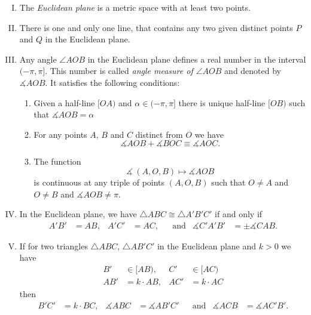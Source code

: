 \begin{enumerate}[I.]
\item\label{def:birkhoff-axioms:0} The \emph{Euclidean plane} is a metric space with at least two points.


\item\label{def:birkhoff-axioms:1} There is one and only one line, 
that contains any two given distinct points $P$ and $Q$ in the Euclidean plane.

\item\label{def:birkhoff-axioms:2} 
Any angle $\angle AOB$ in the Euclidean plane 
defines a real number in the interval $(-\pi,\pi]$.
This number is called \emph{angle measure of $\angle AOB$}
and denoted by $\measuredangle A O B$.
It satisfies the following conditions:
\begin{enumerate}
\item\label{def:birkhoff-axioms:2a} Given a half-line $[O A)$ and $\alpha\in(-\pi,\pi]$ there is unique  half-line $[O B)$ such that $\measuredangle A O B= \alpha$
\item\label{def:birkhoff-axioms:2b} For any points $A$, $B$ and $C$ distinct from $O$ we have
$$\measuredangle A O B+\measuredangle B O C\equiv \measuredangle A O C.$$
\item\label{def:birkhoff-axioms:2c} 
The function 
$$\measuredangle\:(A,O,B)\mapsto\measuredangle A O B$$
is continuous at any triple of points $(A,O,B)$
such that $O\ne A$ and $O\ne B$ and $\measuredangle A O B\ne\pi$.

\end{enumerate}

\item\label{def:birkhoff-axioms:3}  In the Euclidean plane, we have
$\triangle A B C\cong\triangle A' B' C'$
if and only if 
\begin{align*}
A' B'&=A B, & A' C'&= A C, &&\text{and}
&\measuredangle C' A' B'&=\pm\measuredangle C A B.
\end{align*}
\item\label{def:birkhoff-axioms:4}
If for two triangles 
$\triangle ABC$, 
$\triangle AB'C'$ in the Euclidean plane
and $k>0$ we have
\begin{align*}
B'&\in [AB),
& C'&\in [AC)
\\
AB'&=k\cdot AB,&
AC'&=k\cdot AC
\end{align*}
then
\begin{align*}
B'C'&=k\cdot BC,&
\measuredangle ABC&=\measuredangle AB'C'
&&\text{and}
&
\measuredangle ACB&=\measuredangle AC'B'.
\end{align*}
\end{enumerate}

